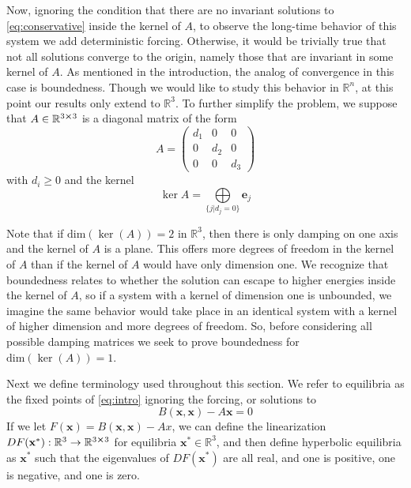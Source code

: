 \documentclass[11pt]{article}
\newcommand{\R}{\mathbb{R}}
\begin{document}
Now, ignoring the condition that there are no invariant solutions to \eqref{eq:conservative} inside the kernel of $A$, to observe the long-time behavior of this system we add deterministic forcing. Otherwise, it would be trivially true that not all solutions converge to the origin, namely those that are invariant in some kernel of $A$. As mentioned in the introduction, the analog of convergence in this case is boundedness. Though we would like to study this behavior in $\R^n$, at this point our results only extend to $\R^3$. To further simplify the problem, we suppose that $A \in \R^{3 \cross 3}$ is a diagonal matrix of the form $$A = \begin{pmatrix}
    d_1 & 0 & 0\\
    0 & d_2 &0 \\
    0 & 0 & d_3
\end{pmatrix}$$ with $d_i \geq 0$ and the kernel $$\ker A = \underset{\{j |  d_j = 0\}}{\bigoplus} \mathbf{e}_j$$

Note that if $\text{dim}(\ker(A)) = 2$ in $\R^3$, then there is only damping on one axis and the kernel of $A$ is a plane. This offers more degrees of freedom in the kernel of $A$ than if the kernel of $A$ would have only dimension one. We recognize that boundedness relates to whether the solution can escape to higher energies inside the kernel of $A$, so if a system with a kernel of dimension one is unbounded, we imagine the same behavior would take place in an identical system with a kernel of higher dimension and more degrees of freedom. So, before considering all possible damping matrices we seek to prove boundedness for $\text{dim}(\ker(A)) = 1$.

Next we define terminology used throughout this section. We refer to equilibria as the fixed points of \eqref{eq:intro} ignoring the forcing, or solutions to $$B(\mathbf{x}, \mathbf{x}) - A\mathbf{x} = 0$$If we let $F(\mathbf{x}) = B(\mathbf{x}, \mathbf{x}) - Ax$, we can define the linearization $DF(\mathbf{\mathbf{x}^*}) : \R^3 \rightarrow \R^{3 \cross 3}$ for equilibria $\mathbf{x}^* \in \R^3$, and then define hyperbolic equilibria as $\mathbf{x}^*$ such that the eigenvalues of $DF(\mathbf{x^*})$ are all real, and one is positive, one is negative, and one is zero. 
\end{document}
